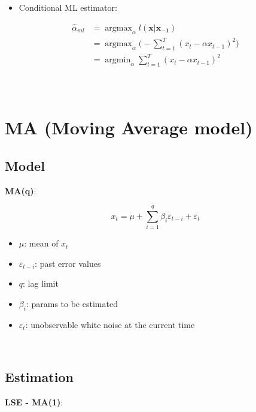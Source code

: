 \documentclass[
]{book}
\providecommand{\tightlist}{%
  \setlength{\itemsep}{0pt}\setlength{\parskip}{0pt}}
\begin{document}
\begin{itemize}
\tightlist
\item
  Conditional ML estimator:
\end{itemize}

\[\begin{align*}
        \hat{\alpha}_{ml}&=\mathop{\mathrm{argmax}}_\alpha{l(\bm{x|x_{-1}})} \\
        &=\mathop{\mathrm{argmax}}_\alpha{\bigg(-\sum_{t=1}^{T}{(x_t-\alpha x_{t-1})^2}\bigg)} \\
        &=\mathop{\mathrm{argmin}}_\alpha{\sum_{t=1}^{T}{(x_t-\alpha x_{t-1})^2}} \\
    \end{align*}\]

~

\hypertarget{ma-moving-average-model}{%
\section{MA (Moving Average model)}\label{ma-moving-average-model}}

\hypertarget{model-1}{%
\subsection{Model}\label{model-1}}

\textbf{MA(q)}:

\[\begin{equation*}
        x_t=\mu+\sum_{i=1}^{q}{\beta_i \varepsilon_{t-i}}+\varepsilon_t
    \end{equation*}\]

\begin{itemize}
\tightlist
\item
  \(\mu\): mean of \(x_t\)
\item
  \(\varepsilon_{t-i}\): past error values
\item
  \(q\): lag limit
\item
  \(\beta_i\): params to be estimated
\item
  \(\varepsilon_t\): unobservable white noise at the current time
\end{itemize}

~

\hypertarget{estimation-1}{%
\subsection{Estimation}\label{estimation-1}}

\textbf{LSE - MA(1)}:
\end{document}
